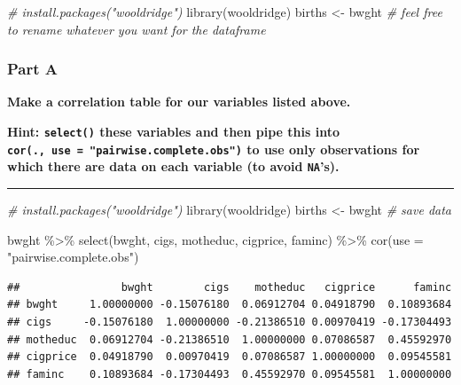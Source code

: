 \documentclass[
]{article}
\newenvironment{Shaded}{\begin{snugshade}}{\end{snugshade}}
\newcommand{\AttributeTok}[1]{\textcolor[rgb]{0.77,0.63,0.00}{#1}}
\newcommand{\CommentTok}[1]{\textcolor[rgb]{0.56,0.35,0.01}{\textit{#1}}}
\newcommand{\FunctionTok}[1]{\textcolor[rgb]{0.00,0.00,0.00}{#1}}
\newcommand{\NormalTok}[1]{#1}
\newcommand{\OtherTok}[1]{\textcolor[rgb]{0.56,0.35,0.01}{#1}}
\newcommand{\SpecialCharTok}[1]{\textcolor[rgb]{0.00,0.00,0.00}{#1}}
\newcommand{\StringTok}[1]{\textcolor[rgb]{0.31,0.60,0.02}{#1}}
\begin{document}
\begin{Shaded}
\begin{Highlighting}[]
\CommentTok{\# install.packages("wooldridge")}
\FunctionTok{library}\NormalTok{(wooldridge)}
\NormalTok{births }\OtherTok{\textless{}{-}}\NormalTok{ bwght }\CommentTok{\# feel free to rename whatever you want for the dataframe}
\end{Highlighting}
\end{Shaded}

\hypertarget{part-a-2}{%
\subsubsection{Part A}\label{part-a-2}}

\textbf{Make a correlation table for our variables listed above.}

\textbf{Hint: \texttt{select()} these variables and then pipe this into
\texttt{cor(.,\ use\ =\ "pairwise.complete.obs")} to use only
observations for which there are data on each variable (to avoid
\texttt{NA}'s).}

\begin{center}\rule{0.5\linewidth}{0.5pt}\end{center}

\begin{Shaded}
\begin{Highlighting}[]
\CommentTok{\# install.packages("wooldridge")}
\FunctionTok{library}\NormalTok{(wooldridge)}
\NormalTok{births }\OtherTok{\textless{}{-}}\NormalTok{ bwght }\CommentTok{\# save data}
\end{Highlighting}
\end{Shaded}

\begin{Shaded}
\begin{Highlighting}[]
\NormalTok{bwght }\SpecialCharTok{\%\textgreater{}\%}
  \FunctionTok{select}\NormalTok{(bwght, cigs, motheduc, cigprice, faminc) }\SpecialCharTok{\%\textgreater{}\%}
  \FunctionTok{cor}\NormalTok{(}\AttributeTok{use =} \StringTok{"pairwise.complete.obs"}\NormalTok{)}
\end{Highlighting}
\end{Shaded}

\begin{verbatim}
##                bwght        cigs    motheduc   cigprice      faminc
## bwght     1.00000000 -0.15076180  0.06912704 0.04918790  0.10893684
## cigs     -0.15076180  1.00000000 -0.21386510 0.00970419 -0.17304493
## motheduc  0.06912704 -0.21386510  1.00000000 0.07086587  0.45592970
## cigprice  0.04918790  0.00970419  0.07086587 1.00000000  0.09545581
## faminc    0.10893684 -0.17304493  0.45592970 0.09545581  1.00000000
\end{verbatim}
\end{document}
